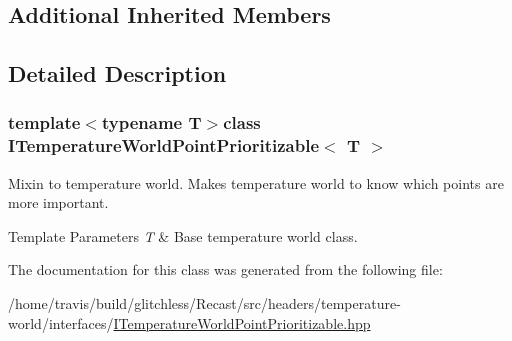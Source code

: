 \subsection*{Additional Inherited Members}


\subsection{Detailed Description}
\subsubsection*{template$<$typename T$>$class I\-Temperature\-World\-Point\-Prioritizable$<$ T $>$}

Mixin to temperature world. Makes temperature world to know which points are more important.


\begin{DoxyTemplParams}{Template Parameters}
{\em T} & Base temperature world class. \\
\hline
\end{DoxyTemplParams}


The documentation for this class was generated from the following file\-:\begin{DoxyCompactItemize}
\item 
/home/travis/build/glitchless/\-Recast/src/headers/temperature-\/world/interfaces/\hyperlink{_i_temperature_world_point_prioritizable_8hpp}{I\-Temperature\-World\-Point\-Prioritizable.\-hpp}\end{DoxyCompactItemize}
